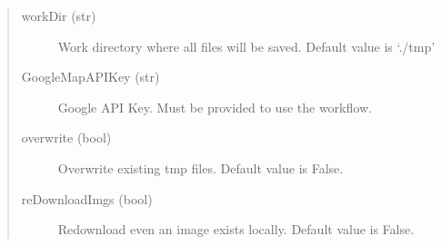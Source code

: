 \documentclass[letterpaper,10pt,english]{sphinxmanual}
\begin{document}
\begin{quote}
\begin{description}
\item[{workDir (str)}] \leavevmode
\sphinxAtStartPar
Work directory where all files will be saved. Default value is ‘./tmp’

\item[{GoogleMapAPIKey (str)}] \leavevmode
\sphinxAtStartPar
Google API Key. Must be provided to use the workflow.

\item[{overwrite (bool)}] \leavevmode
\sphinxAtStartPar
Overwrite existing tmp files. Default value is False.

\item[{reDownloadImgs (bool)}] \leavevmode
\sphinxAtStartPar
Re\sphinxhyphen{}download even an image exists locally. Default value is False.

\end{description}\end{quote}
\end{document}

